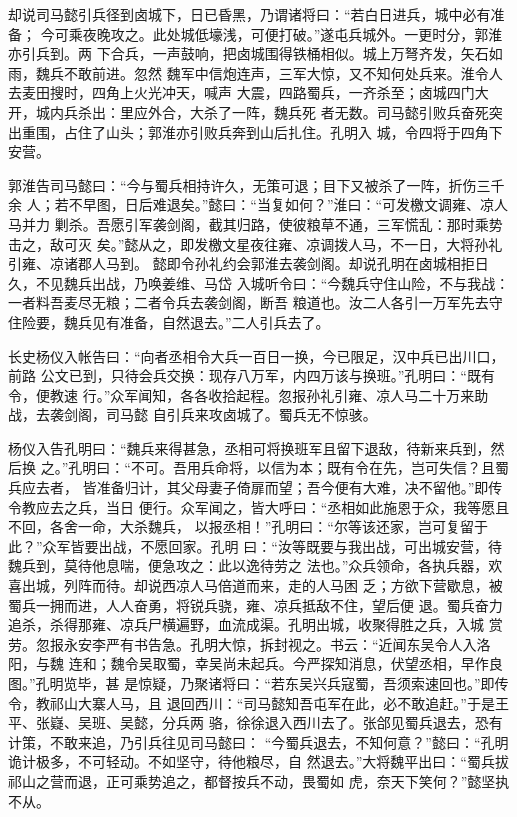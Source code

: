 却说司马懿引兵径到卤城下，日已昏黑，乃谓诸将曰：“若白日进兵，城中必有准备；
今可乘夜晚攻之。此处城低壕浅，可便打破。”遂屯兵城外。一更时分，郭淮亦引兵到。两
下合兵，一声鼓响，把卤城围得铁桶相似。城上万弩齐发，矢石如雨，魏兵不敢前进。忽然
魏军中信炮连声，三军大惊，又不知何处兵来。淮令人去麦田搜时，四角上火光冲天，喊声
大震，四路蜀兵，一齐杀至；卤城四门大开，城内兵杀出：里应外合，大杀了一阵，魏兵死
者无数。司马懿引败兵奋死突出重围，占住了山头；郭淮亦引败兵奔到山后扎住。孔明入
城，令四将于四角下安营。

郭淮告司马懿曰：“今与蜀兵相持许久，无策可退；目下又被杀了一阵，折伤三千余
人；若不早图，日后难退矣。”懿曰：“当复如何？”淮曰：“可发檄文调雍、凉人马并力
剿杀。吾愿引军袭剑阁，截其归路，使彼粮草不通，三军慌乱：那时乘势击之，敌可灭
矣。”懿从之，即发檄文星夜往雍、凉调拨人马，不一日，大将孙礼引雍、凉诸郡人马到。
懿即令孙礼约会郭淮去袭剑阁。却说孔明在卤城相拒日久，不见魏兵出战，乃唤姜维、马岱
入城听令曰：“今魏兵守住山险，不与我战：一者料吾麦尽无粮；二者令兵去袭剑阁，断吾
粮道也。汝二人各引一万军先去守住险要，魏兵见有准备，自然退去。”二人引兵去了。

长史杨仪入帐告曰：“向者丞相令大兵一百日一换，今已限足，汉中兵已出川口，前路
公文已到，只待会兵交换：现存八万军，内四万该与换班。”孔明曰：“既有令，便教速
行。”众军闻知，各各收拾起程。忽报孙礼引雍、凉人马二十万来助战，去袭剑阁，司马懿
自引兵来攻卤城了。蜀兵无不惊骇。

杨仪入告孔明曰：“魏兵来得甚急，丞相可将换班军且留下退敌，待新来兵到，然后换
之。”孔明曰：“不可。吾用兵命将，以信为本；既有令在先，岂可失信？且蜀兵应去者，
皆准备归计，其父母妻子倚扉而望；吾今便有大难，决不留他。”即传令教应去之兵，当日
便行。众军闻之，皆大呼曰：“丞相如此施恩于众，我等愿且不回，各舍一命，大杀魏兵，
以报丞相！”孔明曰：“尔等该还家，岂可复留于此？”众军皆要出战，不愿回家。孔明
曰：“汝等既要与我出战，可出城安营，待魏兵到，莫待他息喘，便急攻之：此以逸待劳之
法也。”众兵领命，各执兵器，欢喜出城，列阵而待。却说西凉人马倍道而来，走的人马困
乏；方欲下营歇息，被蜀兵一拥而进，人人奋勇，将锐兵骁，雍、凉兵抵敌不住，望后便
退。蜀兵奋力追杀，杀得那雍、凉兵尸横遍野，血流成渠。孔明出城，收聚得胜之兵，入城
赏劳。忽报永安李严有书告急。孔明大惊，拆封视之。书云：“近闻东吴令人入洛阳，与魏
连和；魏令吴取蜀，幸吴尚未起兵。今严探知消息，伏望丞相，早作良图。”孔明览毕，甚
是惊疑，乃聚诸将曰：“若东吴兴兵寇蜀，吾须索速回也。”即传令，教祁山大寨人马，且
退回西川：“司马懿知吾屯军在此，必不敢追赶。”于是王平、张嶷、吴班、吴懿，分兵两
骆，徐徐退入西川去了。张郃见蜀兵退去，恐有计策，不敢来追，乃引兵往见司马懿曰：
“今蜀兵退去，不知何意？”懿曰：“孔明诡计极多，不可轻动。不如坚守，待他粮尽，自
然退去。”大将魏平出曰：“蜀兵拔祁山之营而退，正可乘势追之，都督按兵不动，畏蜀如
虎，奈天下笑何？”懿坚执不从。

